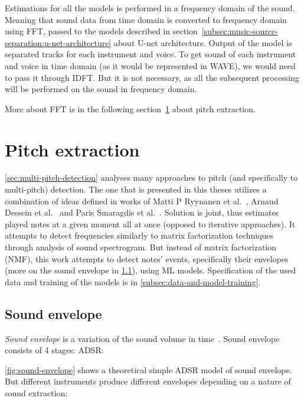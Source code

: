 Estimations for all the models is performed in a frequency domain of the sound. Meaning that sound data from time domain
is converted to frequency domain using \ac{FFT}, passed to the models described in section~\ref{subsec:music-source-separation:u-net-architecture}
about U-net architecture. Output of the model is separated tracks for each instrument and voice. To get sound of each
instrument and voice in time domain (as it would be represented in \ac{WAVE}), we would need to pass it through
\ac{IDFT}. But it is not necessary, as all the subsequent processing will be performed on the sound in frequency domain.

More about \ac{FFT} is in the following section~\ref{sec:pitch-extraction} about pitch extraction.

\section{Pitch extraction}\label{sec:pitch-extraction}
\cref{sec:multi-pitch-detection} analyses many approaches to pitch (and specifically
to multi-pitch) detection. The one that is presented in this theses utilizes a combination of ideas defined in works
of Matti P Ryynanen et al.~\cite{ryynanen2005polyphonic}, Arnaud Dessein et al.~\cite{dessein2010real} and Paris Smaragdis
et al.~\cite{smaragdis2003non}. Solution is joint, thus estimates played notes at a given moment all at once (opposed to
iterative approaches). It attempts to detect frequencies similarly to matrix factorization techniques through analysis
of sound spectrogram. But instead of matrix factorization (\ac{NMF}), this work attempts to detect notes' events,
specifically their envelopes (more on the sound envelope in \cref{subsec:sound-envelope}), using \ac{ML} models.
Specification of the used data and training of the models is in \cref{subsec:data-and-model-training}.

\pagebreak

\subsection{Sound envelope}\label{subsec:sound-envelope}
\textit{Sound envelope} is a variation of the sound volume in time~\cite{dregvaite2015information}. Sound envelope
consists of 4 stages: \ac{ADSR}:


\cref{fig:sound-envelope} shows a theoretical simple \ac{ADSR} model of sound envelope. But different instruments
produce different envelopes depending on a nature of sound extraction:

